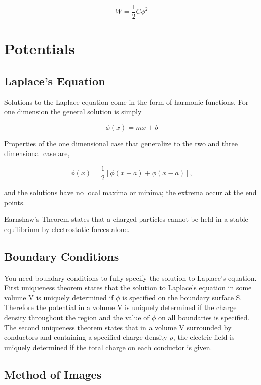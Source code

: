 \documentclass[preprint, review,12pt]{elsarticle}
\begin{document}
\begin{equation}
    W = \frac{1}{2}C \phi^2
\end{equation}

\section{Potentials}

\subsection{Laplace's Equation}

Solutions to the Laplace equation come in the form of harmonic functions. For one dimension the general solution is simply

\begin{equation}
    \phi(x) = mx + b
\end{equation}

Properties of the one dimensional case that generalize to the two and three dimensional case are,

\begin{equation}
    \phi(x) = \frac{1}{2}[\phi(x+a) + \phi(x-a)],
\end{equation}

and the solutions have no local maxima or minima; the extrema occur at the end points. 

Earnshaw's Theorem states that a charged particles cannot be held in a stable equilibrium by electrostatic forces alone.

\subsection{Boundary Conditions}

You need boundary conditions to fully specify the solution to Laplace's equation. First uniqueness theorem states that the solution to Laplace's equation in some volume V is uniquely determined if $\phi$ is specified on the boundary surface S. Therefore the potential in a volume V is uniquely determined if the charge density throughout the region and the value of $\phi$ on all boundaries is specified. The second uniqueness theorem states that in a volume V surrounded by conductors and containing a specified charge density $\rho$, the electric field is uniquely determined if the total charge on each conductor is given.

\subsection{Method of Images}
\end{document}
